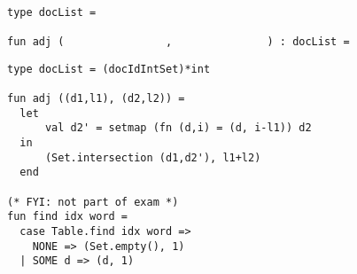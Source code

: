 \begin{mproblem}
\begin{problem}
\begin{lstlisting}[numbers=none]

type docList = 

fun adj (                ,               ) : docList =
\end{lstlisting}

\sol
\begin{lstlisting}[numbers=none]
type docList = (docIdIntSet)*int

fun adj ((d1,l1), (d2,l2)) = 
  let 
      val d2' = setmap (fn (d,i) = (d, i-l1)) d2
  in  
      (Set.intersection (d1,d2'), l1+l2)
  end

(* FYI: not part of exam *)
fun find idx word = 
  case Table.find idx word =>
    NONE => (Set.empty(), 1)
  | SOME d => (d, 1)
\end{lstlisting}
\end{problem}
   
\end{mproblem}






